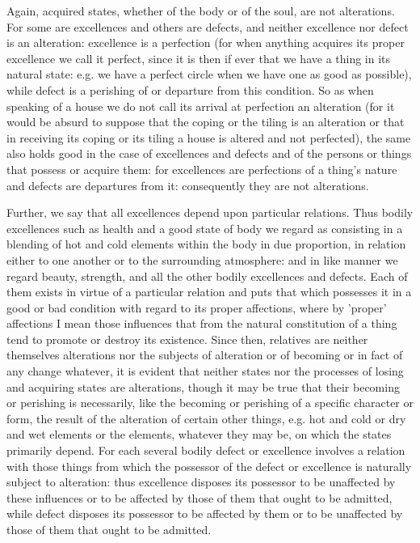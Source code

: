 Again, acquired states, whether of the body or of the soul, are not
alterations. For some are excellences and others are defects, and
neither excellence nor defect is an alteration: excellence is a perfection
(for when anything acquires its proper excellence we call it perfect,
since it is then if ever that we have a thing in its natural state:
e.g. we have a perfect circle when we have one as good as possible),
while defect is a perishing of or departure from this condition. So
as when speaking of a house we do not call its arrival at perfection
an alteration (for it would be absurd to suppose that the coping or
the tiling is an alteration or that in receiving its coping or its
tiling a house is altered and not perfected), the same also holds
good in the case of excellences and defects and of the persons or
things that possess or acquire them: for excellences are perfections
of a thing's nature and defects are departures from it: consequently
they are not alterations. 

Further, we say that all excellences depend upon particular relations.
Thus bodily excellences such as health and a good state of body we
regard as consisting in a blending of hot and cold elements within
the body in due proportion, in relation either to one another or to
the surrounding atmosphere: and in like manner we regard beauty, strength,
and all the other bodily excellences and defects. Each of them exists
in virtue of a particular relation and puts that which possesses it
in a good or bad condition with regard to its proper affections, where
by 'proper' affections I mean those influences that from the natural
constitution of a thing tend to promote or destroy its existence.
Since then, relatives are neither themselves alterations nor the subjects
of alteration or of becoming or in fact of any change whatever, it
is evident that neither states nor the processes of losing and acquiring
states are alterations, though it may be true that their becoming
or perishing is necessarily, like the becoming or perishing of a specific
character or form, the result of the alteration of certain other things,
e.g. hot and cold or dry and wet elements or the elements, whatever
they may be, on which the states primarily depend. For each several
bodily defect or excellence involves a relation with those things
from which the possessor of the defect or excellence is naturally
subject to alteration: thus excellence disposes its possessor to be
unaffected by these influences or to be affected by those of them
that ought to be admitted, while defect disposes its possessor to
be affected by them or to be unaffected by those of them that ought
to be admitted. 

